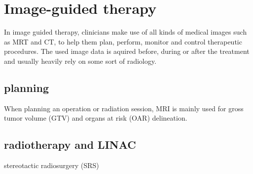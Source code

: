 \section{Image-guided therapy}
    \label{Image-guided therapy}
In image guided therapy, clinicians make use of all kinds of medical images such as MRT and CT, to help them plan, perform, monitor and control therapeutic procedures.
The used image data is aquired before, during or after the treatment and usually heavily rely on some sort of radiology.
\cite{helmbergerRadiologistsLeadingPosition2013}

\subsection{planning}
    \label{planning}
When planning an operation or radiation session, MRI is mainly used for gross tumor volume (GTV) and organs at risk (OAR) delineation.
\cite{lineyMRIRadiotherapyPlanning2019}

  \subsection{radiotherapy and LINAC}
    \label{radiotherapy and LINAC}
stereotactic radiosurgery (SRS)
